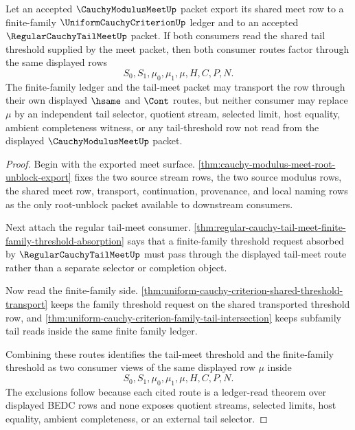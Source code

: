 \begin{theorem}
\label{thm:cauchy-modulus-meet-uniform-family-tail-threshold-factorization}
Let an accepted $\CauchyModulusMeetUp$ packet export its shared meet row to a finite-family $\UniformCauchyCriterionUp$ ledger and to an accepted $\RegularCauchyTailMeetUp$ packet. If both consumers read the shared tail threshold supplied by the meet packet, then both consumer routes factor through the same displayed rows
$$
S_0,S_1,\mu_0,\mu_1,\mu,H,C,P,N.
$$
The finite-family ledger and the tail-meet packet may transport the row through their own displayed $\hsame$ and $\Cont$ routes, but neither consumer may replace $\mu$ by an independent tail selector, quotient stream, selected limit, host equality, ambient completeness witness, or any tail-threshold row not read from the displayed $\CauchyModulusMeetUp$ packet.
\end{theorem}
\begin{proof}
Begin with the exported meet surface. \autoref{thm:cauchy-modulus-meet-root-unblock-export} fixes the two source stream rows, the two source modulus rows, the shared meet row, transport, continuation, provenance, and local naming rows as the only root-unblock packet available to downstream consumers.

Next attach the regular tail-meet consumer. \autoref{thm:regular-cauchy-tail-meet-finite-family-threshold-absorption} says that a finite-family threshold request absorbed by $\RegularCauchyTailMeetUp$ must pass through the displayed tail-meet route rather than a separate selector or completion object.

Now read the finite-family side. \autoref{thm:uniform-cauchy-criterion-shared-threshold-transport} keeps the family threshold request on the shared transported threshold row, and \autoref{thm:uniform-cauchy-criterion-family-tail-intersection} keeps subfamily tail reads inside the same finite family ledger.

Combining these routes identifies the tail-meet threshold and the finite-family threshold as two consumer views of the same displayed row $\mu$ inside
$$
S_0,S_1,\mu_0,\mu_1,\mu,H,C,P,N.
$$
The exclusions follow because each cited route is a ledger-read theorem over displayed BEDC rows and none exposes quotient streams, selected limits, host equality, ambient completeness, or an external tail selector.
\end{proof}

